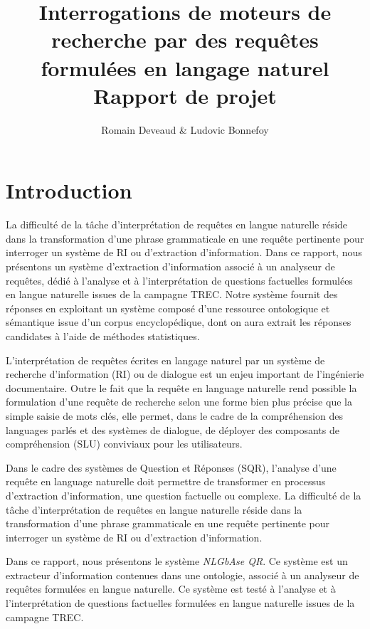 \documentclass[10pt,a4paper]{article}
\title{\Large\bf Interrogations de moteurs de recherche par des requêtes formulées en langage naturel \\ 
  Rapport de projet}
\author{Romain Deveaud \& Ludovic Bonnefoy}
\begin{document}
\parindent=0pt

\maketitle
\newpage
\newpage
\tableofcontents
\newpage

\section{Introduction}
\par La difficulté de la tâche d'interprétation de requêtes en langue naturelle réside dans la transformation d'une phrase grammaticale en une requête pertinente pour interroger un système de RI ou d'extraction d'information. Dans ce rapport, nous présentons un système d'extraction d'information associé à un analyseur de requêtes, dédié à l'analyse et à l'interprétation de questions factuelles formulées en langue naturelle issues de la campagne TREC. Notre système fournit des réponses en exploitant un système composé d'une ressource ontologique et sémantique issue d'un corpus encyclopédique, dont on aura extrait les réponses candidates à l'aide de méthodes statistiques.
\par L'interprétation de requêtes écrites en langage naturel par un système de recherche d'information (RI) ou de dialogue est un enjeu important de l'ingénierie documentaire. Outre le fait que la requête en language naturelle rend possible la formulation d'une requête de recherche selon une forme bien plus précise que la simple saisie de mots clés, elle permet, dans le cadre de la compréhension des languages parlés et des systèmes de dialogue, de déployer des composants de compréhension (SLU) conviviaux pour les utilisateurs. 

\par Dans le cadre des systèmes de Question et Réponses (SQR), l'analyse d'une requête en language naturelle doit permettre de transformer en processus d'extraction d'information, une question factuelle ou complexe. La difficulté de la tâche d'interprétation de requêtes en langue naturelle réside dans la transformation d'une phrase grammaticale en une requête pertinente pour interroger un système de RI ou d'extraction d'information. 

\par Dans ce rapport, nous présentons le système \textit{NLGbAse QR}. Ce système est un extracteur d'information contenues dans une ontologie, associé à un analyseur de requêtes formulées en langue naturelle. Ce système est testé à l'analyse et à l'interprétation de questions factuelles formulées en langue naturelle issues de la campagne TREC. 
\end{document}
